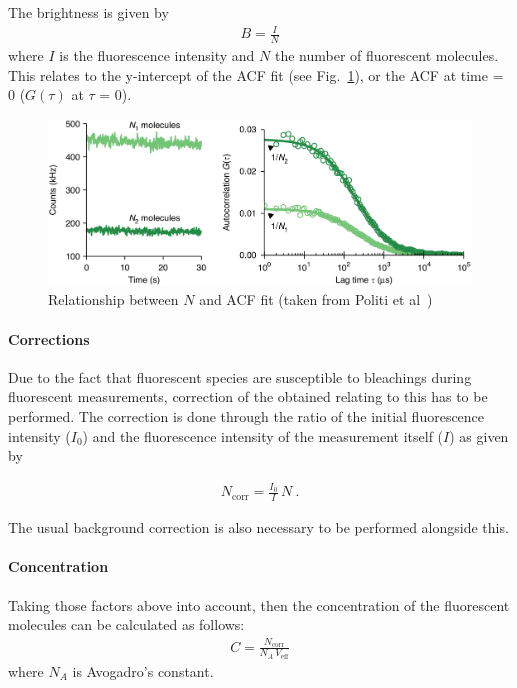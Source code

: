 The brightness is given by 
\begin{align} 
B = \frac{I}{N}
\end{align} 
where $I$ is the fluorescence intensity and $N$ the number of fluorescent molecules. This relates to the y-intercept of the ACF fit (see Fig.~\ref{fig:poliacf}), or the ACF at time = 0 ($G(\tau)$ at $\tau$ = 0).  

\begin{figure}[h!]
	\centering
	\includegraphics[width=.6\columnwidth]{Exp_9_FCS/Figures/npol}
	\caption{Relationship between $N$ and ACF fit (taken from Politi et al~\cite{Politi2018})}
	\label{fig:poliacf}
\end{figure}

\paragraph{Corrections}
Due to the fact that fluorescent species are susceptible to bleachings during fluorescent measurements, correction of the obtained relating to this has to be performed. 
The correction is done through the ratio of the initial fluorescence intensity ($I_{0}$) and the fluorescence intensity of the measurement itself ($I$) as given by

\begin{align} 
N_{\text{corr}}=\frac{I_{0}}{I}\,N~\text{.}
\end{align} 
 
The usual background correction is also necessary to be performed alongside this.

\paragraph{Concentration}
Taking those factors above into account, then the concentration of the fluorescent molecules can be calculated as follows:
\begin{align} 
C=\frac{N_{\text{corr}}}{N_{A}\,V_{\text{eff}}} 
\end{align} 
where $N_{A}$ is Avogadro's constant.

